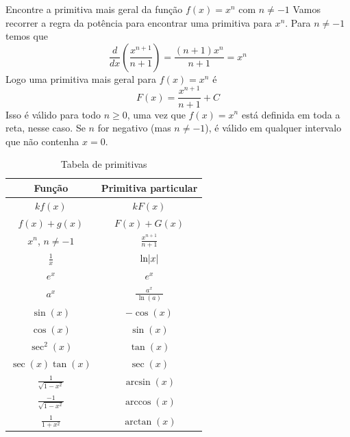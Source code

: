 \begin{example}
  Encontre a primitiva mais geral da função \(f(x)= x^n\) com \(n \neq -1\)
  \solution
  Vamos recorrer a regra da potência para encontrar uma primitiva para $x^n$.
  Para $n \neq -1$ temos que
  \[
    \frac{d}{dx} \left( \frac{x^{n+1}}{n+1}\right)
    = \frac{(n+1)x^n}{n+1}=x^n
  \]
  Logo uma primitiva mais geral para $f(x)=x^n$ é
  \[
    F(x)=\frac{x^{n+1}}{n+1}+ C
  \]
  Isso é válido para todo $n \geq 0$, uma vez que $f(x)=x^n$ está
  definida em toda a reta, nesse caso. Se $n$ for negativo
  (mas $n \neq -1$), é válido em qualquer intervalo que não contenha $x=0$.
\end{example}

\begin{table}[b]
  \centering
  \caption{Tabela de primitivas}
  \label{tab:primitivas}
  \renewcommand*{\arraystretch}{2}
  \begin{tabular}{c<{\quad}>{\quad}c}
    \hline
    Função                      & Primitiva particular    \\ \hline
    \(kf(x)\)                   & \(kF(x)\)               \\
    \(f(x)+g(x)\)               & \(F(x)+G(x)\)           \\[1mm]
    \(x^n\), \(n \neq -1\)      & \(\frac{x^{n+1}}{n+1}\) \\[1mm]
    \(\frac{1}{x}\)             & \(\ln\abs{x}\)          \\
    \(e^x\)                     & \(e^x\)                 \\
    \(a^x\)                     & \(\frac{a^x}{\,\ln(a)\,}\) \\
    \(\sin(x) \)                & \(-\cos(x)\)            \\
    \( \cos(x)\)                & \(\sin(x)\)             \\
    \(\sec^2(x)\)               & \(\tan(x)\)             \\
    \(\sec(x) \tan(x)\)         & \(\sec(x)\)             \\[1mm]
    \(\frac{1}{\sqrt{1-x^2}}\)  & \(\arcsin(x)\)          \\[2mm]
    \(\frac{-1}{\sqrt{1-x^2}}\) & \(\arccos(x)\)          \\[2mm]
    \(\frac{1}{1+x^2}\)         & \(\arctan(x)\)          \\[3mm]
    \hline
  \end{tabular}
\end{table}

